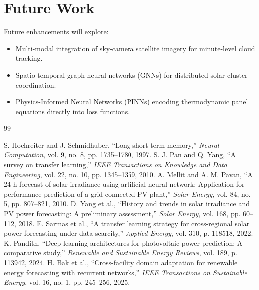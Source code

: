 \documentclass[12pt,a4paper,oneside]{report}
\begin{document}
\section{Future Work}
Future enhancements will explore:
\begin{itemize}
    \item Multi-modal integration of sky-camera satellite imagery for minute-level cloud tracking.
    \item Spatio-temporal graph neural networks (GNNs) for distributed solar cluster coordination.
    \item Physics-Informed Neural Networks (PINNs) encoding thermodynamic panel equations directly into loss functions.
\end{itemize}

\newpage
\begin{thebibliography}{99}

 S. Hochreiter and J. Schmidhuber, ``Long short-term memory,'' \textit{Neural Computation}, vol. 9, no. 8, pp. 1735--1780, 1997.
 S. J. Pan and Q. Yang, ``A survey on transfer learning,'' \textit{IEEE Transactions on Knowledge and Data Engineering}, vol. 22, no. 10, pp. 1345--1359, 2010.
 A. Mellit and A. M. Pavan, ``A 24-h forecast of solar irradiance using artificial neural network: Application for performance prediction of a grid-connected PV plant,'' \textit{Solar Energy}, vol. 84, no. 5, pp. 807--821, 2010.
 D. Yang et al., ``History and trends in solar irradiance and PV power forecasting: A preliminary assessment,'' \textit{Solar Energy}, vol. 168, pp. 60--112, 2018.
 E. Sarmas et al., ``A transfer learning strategy for cross-regional solar power forecasting under data scarcity,'' \textit{Applied Energy}, vol. 310, p. 118518, 2022.
 K. Pandith, ``Deep learning architectures for photovoltaic power prediction: A comparative study,'' \textit{Renewable and Sustainable Energy Reviews}, vol. 189, p. 113942, 2024.
 H. Bak et al., ``Cross-facility domain adaptation for renewable energy forecasting with recurrent networks,'' \textit{IEEE Transactions on Sustainable Energy}, vol. 16, no. 1, pp. 245--256, 2025.

\end{thebibliography}
\end{document}
